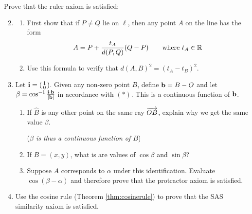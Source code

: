 \begin{exercises}
\exstart Prove that the ruler axiom is satisfied:
\begin{enumerate}\setcounter{enumi}{1}
  \item[]\begin{enumerate}
    \item First show that if $P\neq Q$ lie on $\ell$, then any point $A$ on the line has the form
		\[A=P+\frac{t_A}{d(P,Q)}(Q-P)\qquad \text{where }t_A\in\mathbb{R}\]
		\item Use this formula to verify that $d(A,B)^2=(t_A-t_B)^2$.
	\end{enumerate}
	
	\item Let ${\mathbf{i}}=\left(\begin{smallmatrix}1\\0\end{smallmatrix}\right)$. Given any non-zero point $B$, define ${\mathbf{b}}=B-O$ and let $\beta=\cos^{-1}\frac{{\mathbf{i}}\cdot{\mathbf{b}}}{\left| {\mathbf{b}}\right|}$ in accordance with $(\ast)$. This is a continuous function of ${\mathbf{b}}$.
	\begin{enumerate}
	  \item If $\hat B$ is any other point on the same ray $\overrightarrow{OB}$, explain why we get the same value $\beta$.\par
	  (\emph{$\beta$ is thus a continuous function of $B$})
	  \item If $B=(x,y)$, what is are values of $\cos\beta$ and $\sin\beta$?
	  \item	Suppose $A$ corresponds to $\alpha$ under this identification. Evaluate $\cos(\beta-\alpha)$ and therefore prove that the protractor axiom is satisfied.
	\end{enumerate}
	
	\item Use the cosine rule (Theorem \ref{thm:cosinerule}) to prove that the SAS similarity axiom is satisfied.
\end{enumerate}
\end{exercises}

